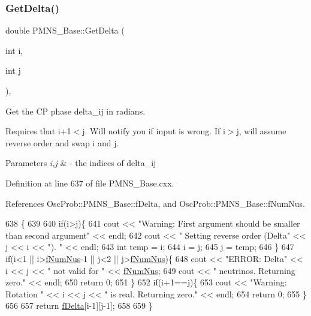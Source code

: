 \subsubsection{\texorpdfstring{Get\+Delta()}{GetDelta()}}
{\footnotesize\ttfamily double P\+M\+N\+S\+\_\+\+Base\+::\+Get\+Delta (\begin{DoxyParamCaption}\item[{int}]{i,  }\item[{int}]{j }\end{DoxyParamCaption})\hspace{0.3cm}{\ttfamily [virtual]}, {\ttfamily [inherited]}}

Get the CP phase delta\+\_\+ij in radians.

Requires that i+1$<$j. Will notify you if input is wrong. If i$>$j, will assume reverse order and swap i and j.


\begin{DoxyParams}{Parameters}
{\em i,j} & -\/ the indices of delta\+\_\+ij \\
\hline
\end{DoxyParams}


Definition at line 637 of file P\+M\+N\+S\+\_\+\+Base.\+cxx.



References Osc\+Prob\+::\+P\+M\+N\+S\+\_\+\+Base\+::f\+Delta, and Osc\+Prob\+::\+P\+M\+N\+S\+\_\+\+Base\+::f\+Num\+Nus.


\begin{DoxyCode}
638 \{
639 
640   \textcolor{keywordflow}{if}(i>j)\{
641     cout << \textcolor{stringliteral}{"Warning: First argument should be smaller than second argument"} << endl;
642     cout << \textcolor{stringliteral}{"         Setting reverse order (Delta"} << j << i << \textcolor{stringliteral}{"). "} << endl;
643     \textcolor{keywordtype}{int} temp = i;
644     i = j;
645     j = temp;
646   \}
647   \textcolor{keywordflow}{if}(i<1 || i>\hyperlink{classOscProb_1_1PMNS__Base_a24bb74bed63569dfe88b18fa6a08060e}{fNumNus}-1 || j<2 || j>\hyperlink{classOscProb_1_1PMNS__Base_a24bb74bed63569dfe88b18fa6a08060e}{fNumNus})\{
648     cout << \textcolor{stringliteral}{"ERROR: Delta"} << i << j << \textcolor{stringliteral}{" not valid for "} << \hyperlink{classOscProb_1_1PMNS__Base_a24bb74bed63569dfe88b18fa6a08060e}{fNumNus};
649     cout << \textcolor{stringliteral}{" neutrinos. Returning zero."} << endl;
650     \textcolor{keywordflow}{return} 0;
651   \}
652   \textcolor{keywordflow}{if}(i+1==j)\{
653     cout << \textcolor{stringliteral}{"Warning: Rotation "} << i << j << \textcolor{stringliteral}{" is real. Returning zero."} << endl;
654     \textcolor{keywordflow}{return} 0;
655   \}
656 
657   \textcolor{keywordflow}{return} \hyperlink{classOscProb_1_1PMNS__Base_ab2a5fa40e689b221c8a7d2c17213810d}{fDelta}[i-1][j-1];
658 
659 \}
\end{DoxyCode}
\mbox{\label{classOscProb_1_1PMNS__Base_ad26815ac5f4805d1259817e4936e5f8f}} 
